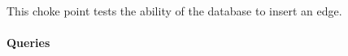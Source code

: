 
This choke point tests the ability of the database to insert an edge.


\paragraph{Queries}
{\raggedright

}